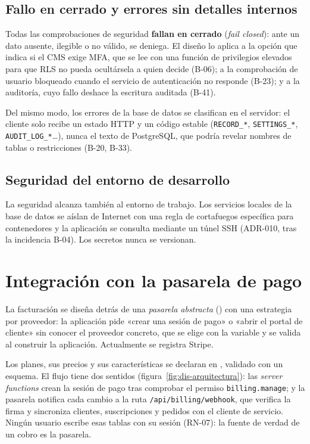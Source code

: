 \subsection{Fallo en cerrado y errores sin detalles internos}
\label{sec:dis-fallo-cerrado}

Todas las comprobaciones de seguridad \textbf{fallan en cerrado}
(\textit{fail closed}): ante un dato ausente, ilegible o no válido, se
deniega. El diseño lo aplica a la opción que indica si el CMS exige MFA, que
se lee con una función de privilegios elevados para que RLS no pueda
ocultársela a quien decide (B-06); a la comprobación de usuario bloqueado
cuando el servicio de autenticación no responde (B-23); y a la auditoría,
cuyo fallo deshace la escritura auditada (B-41).

Del mismo modo, los errores de la base de datos se clasifican en el servidor:
el cliente solo recibe un estado HTTP y un código estable
(\texttt{RECORD\_*}, \texttt{SETTINGS\_*}, \texttt{AUDIT\_LOG\_*}\ldots),
nunca el texto de PostgreSQL, que podría revelar nombres de tablas o
restricciones (B-20, B-33).

\subsection{Seguridad del entorno de desarrollo}
\label{sec:dis-seguridad-entorno}

La seguridad alcanza también al entorno de trabajo. Los servicios locales de
la base de datos se aíslan de Internet con una regla de cortafuegos específica
para contenedores y la aplicación se consulta mediante un túnel SSH (ADR-010,
tras la incidencia B-04). Los secretos nunca se versionan.

\section{Integración con la pasarela de pago}
\label{sec:dis-pagos}

La facturación se diseña detrás de una \emph{pasarela abstracta}
() con una estrategia por proveedor: la
aplicación pide «crear una sesión de pago» o «abrir el portal de cliente» sin
conocer el proveedor concreto, que se elige con la variable
 y se valida al construir la aplicación.
Actualmente se registra Stripe.

Los planes, sus precios y sus características se declaran en
, validado con un esquema. El flujo tiene dos
sentidos (figura~\ref{fig:dis-arquitectura}): las \textit{server functions}
crean la sesión de pago tras comprobar el permiso \texttt{billing.manage}; y
la pasarela notifica cada cambio a la ruta \texttt{/api/billing/webhook}, que
verifica la firma y sincroniza clientes, suscripciones y pedidos con el
cliente de servicio. Ningún usuario escribe esas tablas con su sesión
(RN-07): la fuente de verdad de un cobro es la pasarela.


